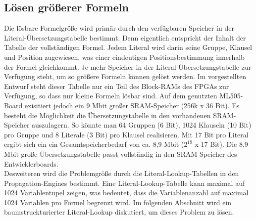 \subsection{Lösen größerer Formeln}
\label{bigformula}
Die lösbare Formelgröße wird primär durch den verfügbaren
Speicher in der Literal-Übersetzungstabelle bestimmt.
Denn eigentlich entspricht der Inhalt der Tabelle der
vollständigen Formel. Jedem Literal wird darin seine
Gruppe, Klausel und Position zugewiesen, was einer
eindeutigen Positionsbestimmung innerhalb der Formel
gleichkommt. Je mehr Speicher in der 
Literal-Übersetzungstabelle zur Verfügung steht, um so
größere Formeln können gelöst werden. Im 
vorgestellten Entwurf steht dieser Tabelle
nur ein Teil des Block-RAMs des FPGAs zur Verfügung, so
dass nur kleine Formeln lösbar sind. Auf dem
genutzten ML505-Board exisitiert jedoch ein 9 Mbit
großer SRAM-Speicher (256k x 36 Bit). Es besteht
die Möglichkeit die Übersetzungstabelle in den 
vorhandenen SRAM-Speicher auszulagern.
So könnte man 64 Gruppen (6 Bit), 1024 Klauseln
(10 Bit) pro Gruppe und 8 Literale (3 Bit) pro 
Klausel realisieren. Mit 17 Bit pro Literal
ergibt sich ein ein Gesamtspeicherbedarf
von ca. 8,9 Mbit ($2^{19}$ x 17 Bit). Die 8,9 Mbit große 
Übersetzungstabelle passt vollständig in den 
SRAM-Speicher des Entwicklerboards.\\
Desweiteren wird die Problemgröße durch
die Literal-Lookup-Tabellen in den
Propagation-Engines bestimmt. Eine
Literal-Lookup-Tabelle kann maximal
auf 1024 Variablentupel zeigen, was
bedeutet, dass die Variablenanzahl 
auf maximal 1024 Variablen pro
Formel begrenzt wird. Im folgenden
Abschnitt wird ein baumstruckturierter
Literal-Lookup diskutiert, um dieses
Problem zu lösen.









